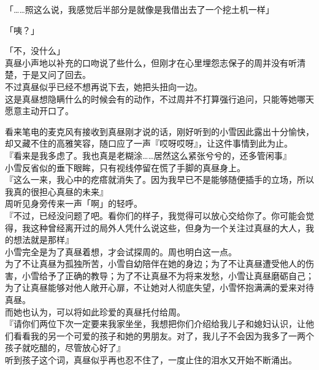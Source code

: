 「……照这么说，我感觉后半部分是就像是我借出去了一个挖土机一样」

「咦？」

「不，没什么」\\

真昼小声地以补充的口吻说了些什么，但刚才在心里埋怨志保子的周并没有听清楚，于是又问了回去。\\

不过真昼似乎已经不想再说下去，她把头扭向一边。\\

这是真昼想隐瞒什么的时候会有的动作，不过周并不打算强行追问，只能等她哪天愿意主动开口了。

看来笔电的麦克风有接收到真昼刚才说的话，刚好听到的小雪因此露出十分愉快，却又藏不住的高雅笑容，随口应了一声『哎呀哎呀』，让这件事情到此为止。\\

『看来是我多虑了。我也真是老糊涂……居然这么紧张兮兮的，还多管闲事』\\

小雪反省似的垂下眼眸，只有视线停留在慌了手脚的真昼身上。\\

『这么一来，我心中的疙瘩就消失了。因为我早已不是能够随便插手的立场，所以我真的很担心真昼的未来』\\

周听见身旁传来一声「啊」的轻呼。\\

『不过，已经没问题了吧。看你们的样子，我觉得可以放心交给你了。你可能会觉得，我这种曾经离开过的局外人凭什么说这些，但身为一个关注过真昼的大人，我的想法就是那样』\\

小雪完全是为了真昼着想，才会试探周的。周也明白这一点。\\

为了不让真昼为孤独所苦，小雪自幼陪伴在她的身边；为了不让真昼遭受他人的伤害，小雪给予了正确的教导；为了不让真昼不为将来发愁，小雪让真昼磨砺自己；为了让真昼能够对他人敞开心扉，不让她对人彻底失望，小雪怀抱满满的爱来对待真昼。\\

而她也认为，可以将如此珍爱的真昼托付给周。\\

『请你们两位下次一定要来我家坐坐，我想把你们介绍给我儿子和媳妇认识，让他们看看我的另一个可爱的孩子和她的男朋友。对了，我儿子不会因为我多了一两个孩子就吃醋的，尽管放心好了』\\

听到孩子这个词，真昼似乎再也忍不住了，一度止住的泪水又开始不断涌出。

